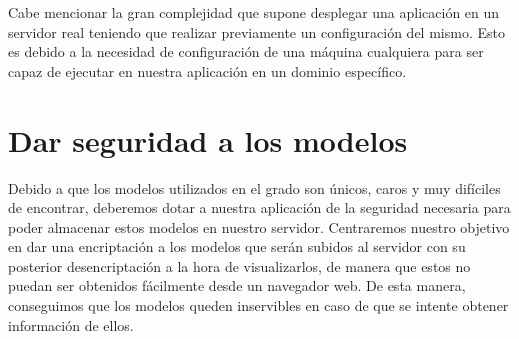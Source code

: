Cabe mencionar la gran complejidad que supone desplegar una aplicación en un servidor real teniendo que realizar previamente un configuración del mismo. Esto es debido a la necesidad de configuración de una máquina cualquiera para ser capaz de ejecutar en nuestra aplicación en un dominio específico.

\section{Dar seguridad a los modelos}
Debido a que los modelos utilizados en el grado son únicos, caros y muy difíciles de encontrar, deberemos dotar a nuestra aplicación de la seguridad necesaria para poder almacenar estos modelos en nuestro servidor. Centraremos nuestro objetivo en dar una encriptación a los modelos que serán subidos al servidor con su posterior desencriptación a la hora de visualizarlos, de manera que estos no puedan ser obtenidos fácilmente desde un navegador web. De esta manera, conseguimos que los modelos queden inservibles en caso de que se intente obtener información de ellos.